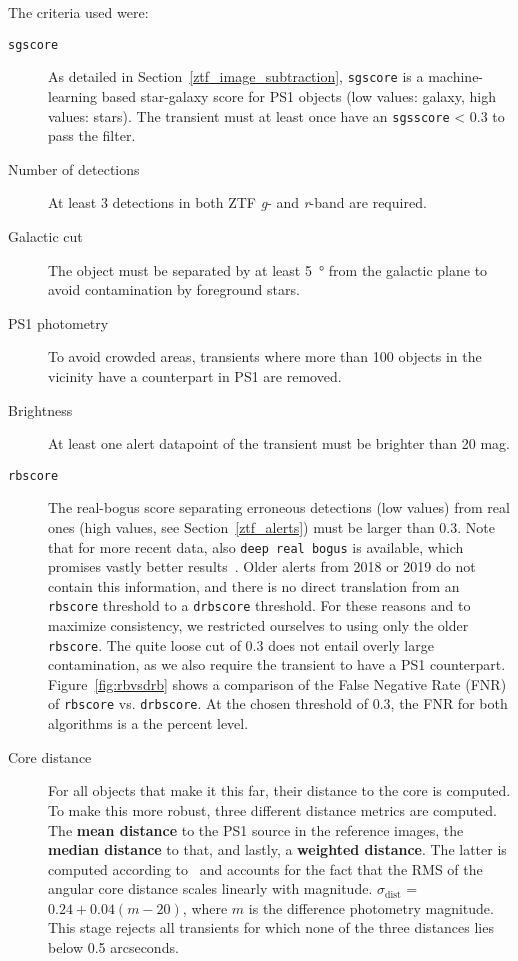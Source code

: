 The criteria used were:
\begin{description}
    \item[\texttt{sgscore}] As detailed in Section~\ref{ztf_image_subtraction}, \texttt{sgscore} is a machine-learning based star-galaxy score for PS1 objects (low values: galaxy, high values: stars). The transient must at least once have an \texttt{sgsscore} < 0.3 to pass the filter.
    \item[Number of detections] At least 3 detections in both ZTF \textit{g}- and \textit{r}-band are required.
    \item[Galactic cut] The object must be separated by at least \SI{5}{\degree} from the galactic plane to avoid contamination by foreground stars.
    \item[PS1 photometry] To avoid crowded areas, transients where more than 100 objects in the vicinity have a counterpart in PS1 are removed.
    \item[Brightness] At least one alert datapoint of the transient must be brighter than 20 mag.
    \item[\texttt{rbscore}] The real-bogus score separating erroneous detections (low values) from real ones (high values, see Section~\ref{ztf_alerts}) must be larger than 0.3. Note that for more recent data, also \texttt{deep real bogus} is available, which promises vastly better results~. Older alerts from 2018 or 2019 do not contain this information, and there is no direct translation from an \texttt{rbscore} threshold to a \texttt{drbscore} threshold. For these reasons and to maximize consistency, we restricted ourselves to using only the older \texttt{rbscore}. The quite loose cut of 0.3 does not entail overly large contamination, as we also require the transient to have a PS1 counterpart. Figure~\ref{fig:rbvsdrb} shows a comparison of the False Negative Rate (FNR) of \texttt{rbscore} vs. \texttt{drbscore}. At the chosen threshold of $0.3$, the FNR for both algorithms is a the percent level.
    \item[Core distance] For all objects that make it this far, their distance to the core is computed. To make this more robust, three different distance metrics are computed. The \textbf{mean distance} to the PS1 source in the reference images, the \textbf{median distance} to that, and lastly, a \textbf{weighted distance}. The latter is computed according to~ and accounts for the fact that the RMS of the angular core distance scales linearly with magnitude. $\sigma_\text{dist}$ = $0.24 + 0.04(m-20)$, where $m$ is the difference photometry magnitude. This stage rejects all transients for which none of the three distances lies below 0.5 arcseconds.
\end{description}

